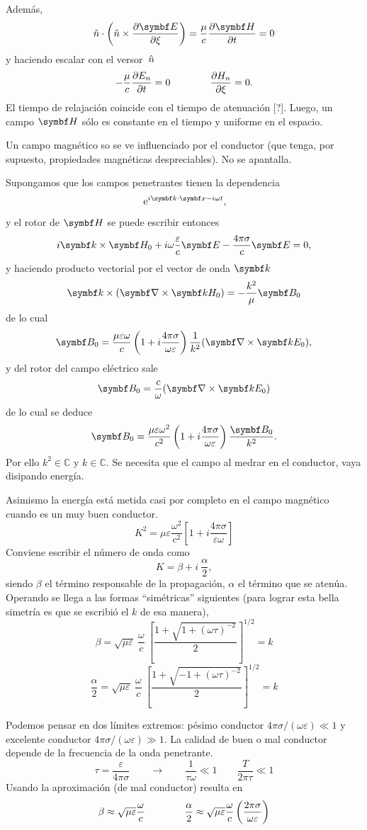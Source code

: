 \documentclass[10pt,oneside]{CBFT_book}
\begin{document}
Además,
\[
	\hat{n} \cdot \left( \hat{n} \times \dpar{\vb{E}}{\xi} \right) =
	\frac{\mu}{c} \dpar{ \vb{H} }{t} = 0
\]
y haciendo escalar con el versor $\:\hat{n}$
\[
	- \frac{\mu}{c}\frac{\partial^{\hspace{-0.05em}} {E_n}}{\partial {t}^{\hspace{-0.05em}}} = 0  \qquad \qquad \frac{\partial^{\hspace{-0.05em}} {H_n}}{\partial {\xi}^{\hspace{-0.05em}}} = 0.
\]
El tiempo de relajación coincide con el tiempo de atenuación [?].
Luego, un campo $\vb{H}$ sólo es constante en el tiempo y uniforme en el espacio.

Un campo magnético so se ve influenciado por el conductor (que tenga, por supuesto,
propiedades magnéticas despreciables). No se apantalla. 

Supongamos que los campos penetrantes tienen la dependencia
\[
	\euler^{i \pe{k}{x} - i \omega t},
\]
y el rotor de $\vb{H}$ se puede escribir entonces
\[
	i \pv{k}{H_0} + i \omega \frac{\varepsilon}{c} \vb{E} -
	\frac{4 \pi \sigma }{c} \vb{E} = 0,
\]
y haciendo producto vectorial por el vector de onda $\vb{k}$
\[
	\vb{k}\times (\rotorm{k}{H_0}) = - \frac{k^2}{\mu} \vb{B}_0
\]
de lo cual
\[
	\vb{B}_0 =\frac{\mu \varepsilon \omega }{ c} 
	\left( 1 + i \frac{4\pi\sigma}{\omega\varepsilon}\right) 
	\frac{1}{k^2} (\rotorm{k}{E_0}),
\]
y del rotor del campo eléctrico sale
\[
	\vb{B}_0 = \frac{c}{\omega} (\rotorm{k}{E_0})
\]
de lo cual se deduce
\[
	\vb{B}_0 =\frac{\mu \varepsilon \omega^2 }{ c^2 } 
	\left( 1 + i \frac{4\pi\sigma}{\omega\varepsilon}\right) 
	\frac{\vb{B}_0}{k^2}.
\]
Por ello $ k^2 \in \mathbb{C}$ y $k \in \mathbb{C} $. 
Se necesita que el campo al medrar en el conductor, vaya disipando energía. 

Asimismo la energía está metida casi por completo en el campo magnético 
cuando es un muy buen conductor.
\[
	K^2 = \mu \varepsilon \frac{\omega^2}{c^2} 
	\left[ 1 + i\frac{4\pi\sigma}{\varepsilon \omega} \right]
\]
Conviene escribir el número de onda como
\[
	K = \beta + i \: \frac{\alpha}{2},
\]
siendo $\beta$ el término responsable de la propagación, $\alpha$ el término
que se atenúa. 
Operando se llega a las formas ``simétricas'' siguientes (para lograr esta 
bella simetría es que se escribió el $k$ de esa manera),
\[
	\beta = \sqrt{ \mu \varepsilon } \: \frac{\omega}{c} \:
	\left[ \frac{1 + \sqrt{ 1 + (\omega\tau )^{-2}}}{2}\right]^{1/2} = k
\]
\[
	\frac{\alpha}{2} = \sqrt{ \mu \varepsilon } \: \frac{\omega}{c} \:
	\left[ \frac{1 + \sqrt{ -1 + (\omega\tau )^{-2}}}{2}\right]^{1/2} = k
\]

Podemos pensar en dos límites extremos: pésimo conductor 
$ 4 \pi \sigma / (\omega \varepsilon ) \ll 1 $ y excelente conductor 
$ 4 \pi \sigma / (\omega \varepsilon ) \gg 1 $.
La calidad de buen o mal conductor depende de la frecuencia de la onda penetrante.
\[
	\tau = \frac{\varepsilon}{4\pi\sigma} \qquad \rightarrow \qquad 
	\frac{1}{\tau \omega } \ll 1 \qquad \frac{T}{2\pi\tau} \ll 1
\]
Usando la aproximación (de mal conductor) resulta en
\[
	\beta \approx \sqrt{ \mu \varepsilon } \frac{\omega}{c} \qquad \qquad 
	\frac{\alpha}{2} \approx \sqrt{ \mu \varepsilon } \frac{\omega}{c} 
	\left( \frac{  2 \pi \sigma  }{ \omega \varepsilon  } \right)
\]
\end{document}
